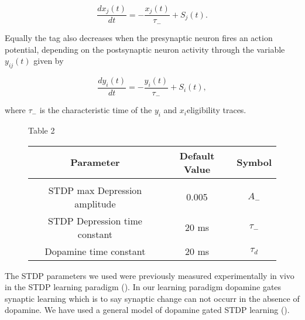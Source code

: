 \begin{equation}
\frac{dx_{j}(t)}{dt}=-\frac{x_{j}(t)}{\tau_{-}}+S_{j}(t).
\end{equation}
\begin{minipage}[t]{1\columnwidth}%
Equally the tag also decreases when the presynaptic neuron fires an
action potential, depending on the postsynaptic neuron activity through
the variable $y_{ij}(t)$ given by%
\end{minipage}

\begin{equation}
\frac{dy_{i}(t)}{dt}=-\frac{y_{i}(t)}{\tau_{-}}+S_{i}(t),
\end{equation}
\begin{minipage}[t]{1\columnwidth}%
where $\tau_{-}$ is the characteristic time of the $y_{i}$ and $x_{i}$eligibility
traces. %
\end{minipage}

\begin{figure}[h]
\hfill{}Table 2\hfill{}

\hfill{}%
\begin{tabular}{ccc}
\hline 
\multicolumn{1}{c}{Parameter} & \multicolumn{1}{c}{Default Value} & \multicolumn{1}{c}{Symbol }\tabularnewline
\hline 
 &  & \tabularnewline
\hline 
STDP max Depression amplitude  & 0.005  & $A_{-}$\tabularnewline
\hline 
STDP Depression time constant  & 20 ms  & $\tau_{-}$\tabularnewline
\hline 
Dopamine time constant & 20 ms & $\tau_{d}$\tabularnewline
\hline 
\end{tabular}\hfill{}
\end{figure}


The STDP parameters we used were previously measured experimentally
in vivo in the STDP learning paradigm (\citealp{Abbott:2000gg}).
In our learning paradigm dopamine gates synaptic learning which is
to say synaptic change can not occurr in the absence of dopamine.
We have used a general model of dopamine gated STDP learning (\citealp{Izhikevich:2004ul}). 


